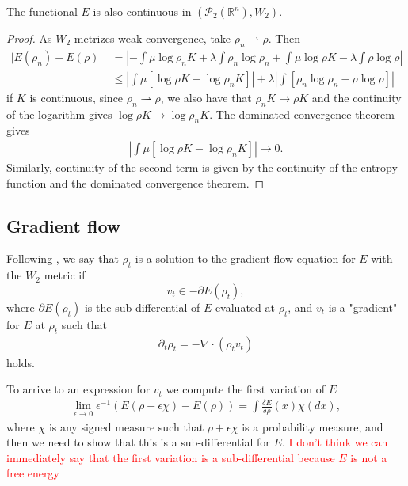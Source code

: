 \documentclass[a4paper]{article}
\theoremstyle{definition}
\def\real{\mathbb{R}}
\begin{document}
The functional $E$ is also continuous in $\left(\mathcal{P}_2(\real^n), W_2\right)$.
\begin{proof}
As $W_2$ metrizes weak convergence, take $\rho_n \rightharpoonup \rho$. Then
\begin{align*}
\vert E(\rho_n) - E(\rho)\vert &= \left\lvert -\int\mu\log\rho_n K+\lambda\int\rho_n\log\rho_n +\int\mu\log\rho K-\lambda\int\rho\log\rho\right\rvert\\
&\leq  \left\lvert \int\mu\left[\log\rho K - \log\rho_n K \right]\right\rvert +\lambda\left\lvert\int\left[ \rho_n\log\rho_n -\rho\log\rho\right]\right\rvert
\end{align*}
if $K$ is continuous, since $\rho_n \rightharpoonup \rho$, we also have that $\rho_n K \rightarrow \rho K$ and the continuity of the logarithm gives $\log\rho K \rightarrow\log\rho_n K$. The dominated convergence theorem gives
\begin{align*}
\left\lvert \int\mu\left[\log\rho K - \log\rho_n K \right]\right\rvert \rightarrow 0.
\end{align*}
Similarly, continuity of the second term is given by the continuity of the entropy function and the dominated convergence theorem.
\end{proof}

\subsection{Gradient flow}
Following \citet[Definition 11.1.1]{ambrosio2008gradient}, we say that $\rho_t$ is a solution to the gradient flow equation for $E$ with the $W_2$ metric if
\begin{equation*}
v_t \in -\partial E(\rho_t),
\end{equation*}
where $\partial E(\rho_t)$ is the sub-differential of $E$ evaluated at $\rho_t$, and $v_t$ is a "gradient" for $E$ at $\rho_t$ such that
\begin{align*}
\partial_{t}\rho_{t}=-\nabla\cdot\left(\rho_{t}v_t\right)
\end{align*} 
holds.

To arrive to an expression for $v_t$ we compute the first variation of $E$
\begin{align*}
\lim_{\epsilon\rightarrow0}\epsilon^{-1}\left(E(\rho+\epsilon\chi)-E(\rho)\right)=\int\frac{\delta E}{\delta\rho}\left(x\right)\chi\left(dx\right),
\end{align*}
where $\chi$ is any signed measure such that $\rho+\epsilon\chi$ is a probability measure, and then we need to show that this is a sub-differential for $E$.
\textcolor{red}{I don't think we can immediately say that the first variation is a sub-differential because $E$ is not a free energy \citep[Lemma 8-10]{carrillo2006contractions}}
\end{document}
